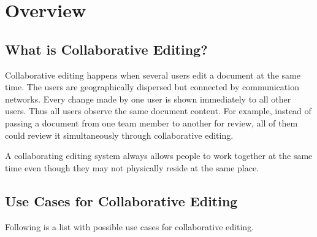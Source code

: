 \chapter{Overview}
\label{chapter:overview}



\section{What is Collaborative Editing?}
Collaborative editing happens when several users edit a document at the same time. The users are geographically dispersed but connected by communication networks. Every change made by one user is shown immediately to all other users. Thus all users observe the same document content. For example, instead of passing a document from one team member to another for review, all of  them could review it simultaneously through collaborative editing.

A collaborating editing system always allows people to work together at the same time even though they may not physically reside at the same place.



\section{Use Cases for Collaborative Editing}
Following is a list with possible use cases for collaborative editing.

